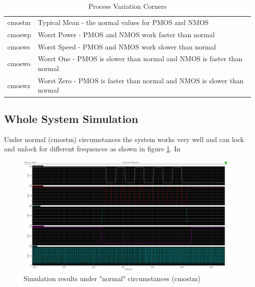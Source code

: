 \documentclass[a4paper,12pt]{article} \usepackage{graphicx}
\begin{document}
\begin{table}[h]
        \centering
        \begin{tabular}{|l|l|}
                \hline 
                cmostm & Typical Mean - the normal values for PMOS and NMOS \\
                cmoswp & Worst Power - PMOS and NMOS work faster than normal \\
                cmosws & Worst Speed - PMOS and NMOS work slower than normal \\
                cmoswo & Worst One - PMOS is slower than normal and NMOS is
                faster than normal \\
                cmoswz & Worst Zero - PMOS is faster than normal and NMOS is
                slower than normal \\
                \hline
        \end{tabular}
        \caption{Process Variation Corners}
        \label{tab:corners}
\end{table}

\subsection{Whole System Simulation}
Under normal (cmostm) circumstances the system works very well and can
lock and unlock for different frequences as shown in figure
\ref{fig:WS_sim_tm}. In

\begin{figure}[h]
  \centering
  \includegraphics[width=\textwidth]{../Bilder/WS_sim_tm.png}
  \caption{Simulation results under "normal" circumstances (cmostm)}
  \label{fig:WS_sim_tm}
\end{figure}
\end{document}
